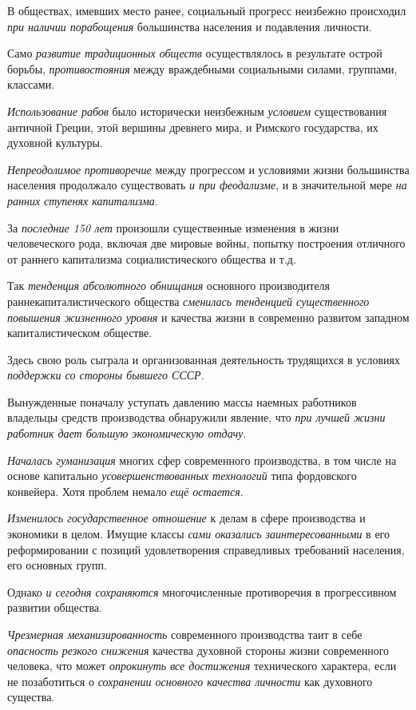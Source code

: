 \documentclass[a4paper,14pt,russian]{extreport}
\begin{document}
В обществах, имевших место ранее, социальный прогресс неизбежно происходил \emph{при наличии порабощения} большинства населения и подавления личности.

Само \emph{развитие традиционных обществ} осуществлялось в результате острой борьбы, \emph{противостояния} между враждебными социальными силами, группами, классами.

\emph{Использование рабов} было исторически неизбежным \emph{условием} существования античной Греции, этой вершины древнего мира, и Римского государства, их духовной культуры.

\emph{Непреодолимое} \emph{противоречие} между прогрессом и условиями жизни большинства населения продолжало существовать \emph{и при феодализме}, и в значительной мере \emph{на ранних ступенях капитализма}.

За \emph{последние 150 лет} произошли существенные изменения в жизни человеческого рода, включая две мировые войны, попытку построения отличного от раннего капитализма социалистического общества и т.д.

Так \emph{тенденция абсолютного обнищания} основного производителя раннекапиталистического общества \emph{сменилась тенденцией существенного повышения жизненного уровня} и качества жизни в современно развитом западном капиталистическом обществе.

Здесь свою роль сыграла и организованная деятельность трудящихся в условиях \emph{поддержки со стороны бывшего СССР}.

Вынужденные поначалу уступать давлению массы наемных работников владельцы средств производства обнаружили явление, что \emph{при лучшей жизни работник дает большую экономическую отдачу}.

\emph{Началась гуманизация} многих сфер современного производства, в том числе на основе капитально \emph{усовершенствованных технологий} типа фордовского конвейера. Хотя проблем немало \emph{ещё остается}.

\emph{Изменилось государственное отношение} к делам в сфере производства и экономики в целом. Имущие классы \emph{сами оказались заинтересованными} в его реформировании с позиций удовлетворения справедливых требований населения, его основных групп.

Однако \emph{и сегодня сохраняются} многочисленные противоречия в прогрессивном развитии общества.

\emph{Чрезмерная механизированность} современного производства таит в себе \emph{опасность резкого снижения} качества духовной стороны жизни современного человека, что может \emph{опрокинуть все достижения} технического характера, если не позаботиться о \emph{сохранении основного качества личности} как духовного существа.
\end{document}
